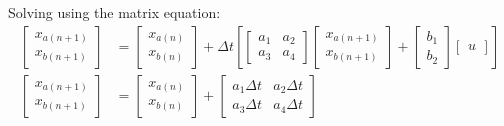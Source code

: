 \documentclass[11pt]{article}
\begin{document}

Solving using the matrix equation:
\begin{subequations}
  \begin{align}
    \begin{bmatrix}
      x_{a(n+1)} \\
      x_{b(n+1)}
    \end{bmatrix} &=
    \begin{bmatrix}
      x_{a(n)} \\
      x_{b(n)}
    \end{bmatrix} +
    \Delta t \left[
    \begin{bmatrix}
      a_1 & a_2 \\
      a_3 & a_4
    \end{bmatrix}
    \begin{bmatrix}
      x_{a(n+1)} \\
      x_{b(n+1)}
    \end{bmatrix} +
    \begin{bmatrix}
      b_1 \\
      b_2
    \end{bmatrix}
    \begin{bmatrix}
      u
    \end{bmatrix}
    \right] \\
    \begin{bmatrix}
      x_{a(n+1)} \\
      x_{b(n+1)}
    \end{bmatrix} &=
    \begin{bmatrix}
      x_{a(n)} \\
      x_{b(n)}
    \end{bmatrix} +
    \begin{bmatrix}
      a_1\Delta t & a_2\Delta t \\
      a_3\Delta t & a_4\Delta t

\end{bmatrix}
\end{align}
\end{subequations}
\end{document}
